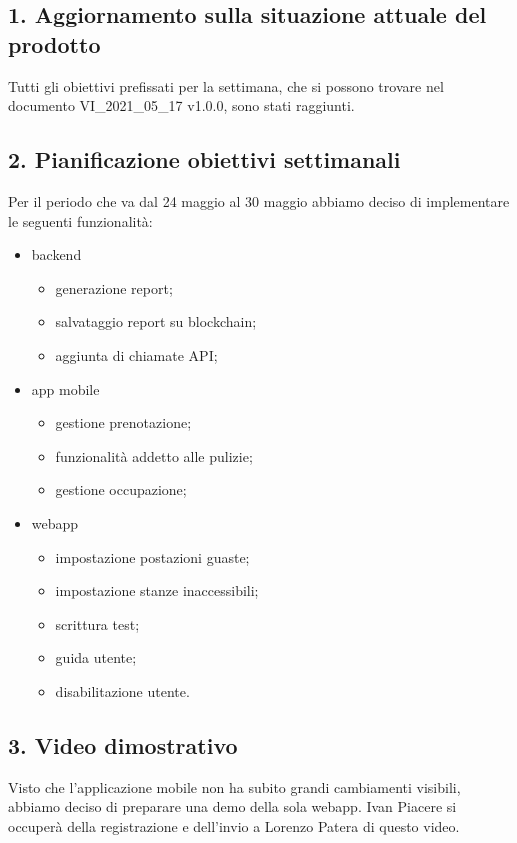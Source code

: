\subsection*{\hypertarget{link1}{1. Aggiornamento sulla situazione attuale del prodotto}}
Tutti gli obiettivi prefissati per la settimana, che si possono trovare nel documento VI\_2021\_05\_17 v1.0.0, sono stati raggiunti.
\subsection*{2. Pianificazione obiettivi settimanali}
Per il periodo che va dal 24 maggio al 30 maggio abbiamo deciso di implementare le seguenti funzionalità:
\begin{itemize}
	\item backend
	\begin{itemize}
		\item generazione report;
		\item salvataggio report su blockchain;
		\item aggiunta di chiamate API;
	\end{itemize}
	\item app mobile
	\begin{itemize}
		\item gestione prenotazione;
		\item funzionalità addetto alle pulizie;
		\item gestione occupazione;
	\end{itemize}
	\item webapp
	\begin{itemize}
		\item impostazione postazioni guaste;
		\item impostazione stanze inaccessibili;
		\item scrittura test;
		\item guida utente;
		\item disabilitazione utente.
	\end{itemize}
\end{itemize}
\subsection*{3. Video dimostrativo}
Visto che l'applicazione mobile non ha subito grandi cambiamenti visibili, abbiamo deciso di preparare una demo della sola webapp. Ivan Piacere si occuperà della registrazione e dell'invio a Lorenzo Patera di questo video.
